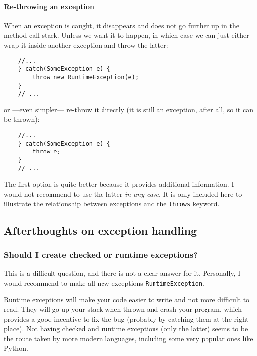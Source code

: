 \paragraph{Re-throwing an exception}
\label{sec:re-throwing-an}

When an exception is caught, it disappears and does not go further up
in the method call stack. Unless we want it to happen, in which case
we can just either wrap it inside another exception and throw the
latter: 

\begin{verbatim}
    //...
    } catch(SomeException e) {
        throw new RuntimeException(e);
    }
    // ...
\end{verbatim}

or ---even simpler--- re-throw it directly (it is still an exception,
after all, so it can be thrown): 

\begin{verbatim}
    //...
    } catch(SomeException e) {
        throw e;
    }
    // ...
\end{verbatim}

The first option is quite better because it provides additional
information. I would not recommend to use the latter \emph{in any
  case}. It is only included here to illustrate the
relationship between exceptions and the \verb+throws+ keyword.



\subsection{Afterthoughts on exception handling}
\label{sec:afterth-except-handl}

\subsubsection{Should I create checked or runtime exceptions?}
\label{sec:should-i-create}

This is a difficult question, and there is not a clear answer for
it. Personally, I would recommend to make all new exceptions
\verb+RuntimeException+. 

Runtime exceptions will make your code easier to write
and not more difficult to read. They will go up your stack when thrown
and crash your program, which provides a good incentive to fix
the bug (probably by catching them at the right place). 
Not having checked and runtime exceptions (only the latter) seems
to be the route taken by more modern languages, including some very
popular ones like Python.


